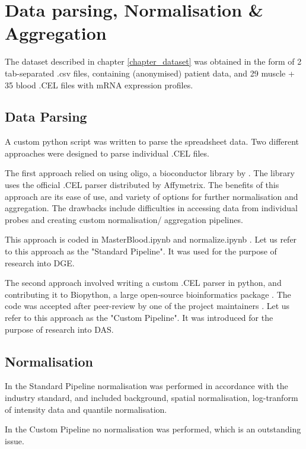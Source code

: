 \section{Data parsing, Normalisation \& Aggregation} \label{chapter_parsing}

The dataset described in chapter \ref{chapter_dataset} was obtained in the form of 2 tab-separated .csv files, containing (anonymised) patient data, and 29 muscle + 35 blood .CEL files with mRNA expression profiles.

\subsection{Data Parsing} \label{section_parsing}

A custom python script was written to parse the spreadsheet data. Two different approaches were designed to parse individual .CEL files.

The first approach relied on using oligo, a bioconductor library by \cite{Carvalho2010}. The library uses the official .CEL parser distributed by Affymetrix. The benefits of this approach are its ease of use, and variety of options for further normalisation and aggregation. The drawbacks include difficulties in accessing data from individual probes and creating custom normalisation/ aggregation pipelines.

This approach is coded in MasterBlood.ipynb \parencite{MasterBlood2017} and normalize.ipynb \parencite{Normalise2017}. Let us refer to this approach as the "Standard Pipeline". It was used for the purpose of research into DGE.

The second approach involved writing a custom .CEL parser in python, and contributing it to Biopython, a large open-source bioinformatics package \parencite{Cock2009}. The code was accepted after peer-review by one of the project maintainers \parencite{Kurkiewicz2016}. Let us refer to this approach as the "Custom Pipeline". It was introduced for the purpose of research into DAS.

\subsection{Normalisation}

In the Standard Pipeline normalisation was performed in accordance with the industry standard, and included background, spatial normalisation, log-tranform of intensity data and quantile normalisation.

In the Custom Pipeline no normalisation was performed, which is an outstanding issue.

